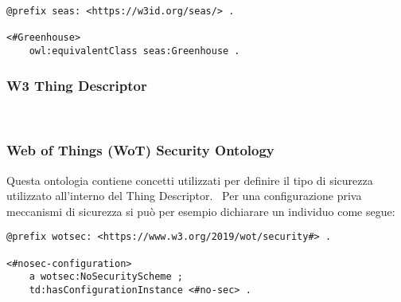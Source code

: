 \begin{verbatim}
@prefix seas: <https://w3id.org/seas/> .

<#Greenhouse>
	owl:equivalentClass seas:Greenhouse .
\end{verbatim}

\subsubsection{W3 Thing Descriptor}
~\cite{ThingDes54:online}
\subsubsection{Web of Things (WoT) Security Ontology}
Questa ontologia contiene concetti utilizzati per definire il tipo di sicurezza utilizzato all'interno del Thing Descriptor.~\cite{WebofThi54:online}
Per una configurazione priva meccanismi di sicurezza si può per esempio dichiarare un individuo come segue:
\begin{verbatim}
@prefix wotsec: <https://www.w3.org/2019/wot/security#> .

<#nosec-configuration>
	a wotsec:NoSecurityScheme ;
	td:hasConfigurationInstance <#no-sec> .
\end{verbatim}
